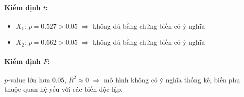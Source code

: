 \paragraph{Kiểm định $t$:}
\begin{itemize}
    \item $X_1$: $p = 0.527 > 0.05$ $\Rightarrow$ không đủ bằng chứng biến có ý nghĩa
    \item $X_2$: $p = 0.662 > 0.05$ $\Rightarrow$ không đủ bằng chứng biến có ý nghĩa
\end{itemize}

\paragraph{Kiểm định $F$:}
$p$-value lớn hơn 0.05, $R^2 \approx 0$ $\Rightarrow$ mô hình không có ý nghĩa thống kê, biến phụ thuộc quan hệ yếu với các biến độc lập.
